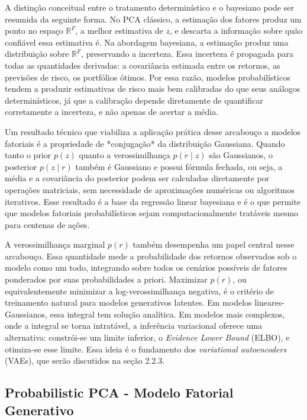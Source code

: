 A distinção conceitual entre o tratamento determinístico e o bayesiano pode ser resumida da seguinte forma. No PCA clássico, a estimação dos fatores produz um ponto no espaço $\mathbb{R}^F$, a melhor estimativa de $z$, e descarta a informação sobre quão confiável essa estimativa é. Na abordagem bayesiana, a estimação produz uma distribuição sobre $\mathbb{R}^F$, preservando a incerteza. Essa incerteza é propagada para todas as quantidades derivadas: a covariância estimada entre os retornos, as previsões de risco, os portfólios ótimos. Por essa razão, modelos probabilísticos tendem a produzir estimativas de risco mais bem calibradas do que seus análogos determinísticos, já que a calibração depende diretamente de quantificar corretamente a incerteza, e não apenas de acertar a média.

Um resultado técnico que viabiliza a aplicação prática desse arcabouço a modelos fatoriais é a propriedade de *conjugação* da distribuição Gaussiana. Quando tanto o prior $p(z)$ quanto a verossimilhança $p(r \mid z)$ são Gaussianos, o posterior $p(z \mid r)$ também é Gaussiano e possui fórmula fechada, ou seja, a média e a covariância do posterior podem ser calculadas diretamente por operações matriciais, sem necessidade de aproximações numéricas ou algoritmos iterativos. Esse resultado é a base da regressão linear bayesiana e é o que permite que modelos fatoriais probabilísticos sejam computacionalmente tratáveis mesmo para centenas de ações.

A verossimilhança marginal $p(r)$ também desempenha um papel central nesse arcabouço. Essa quantidade mede a probabilidade dos retornos observados sob o modelo como um todo, integrando sobre todos os cenários possíveis de fatores ponderados por suas probabilidades a priori. Maximizar $p(r)$, ou equivalentemente minimizar a log-verossimilhança negativa, é o critério de treinamento natural para modelos generativos latentes. Em modelos lineares-Gaussianos, essa integral tem solução analítica. Em modelos mais complexos, onde a integral se torna intratável, a inferência variacional oferece uma alternativa: constrói-se um limite inferior, o \textit{Evidence Lower Bound} (ELBO), e otimiza-se esse limite. Essa ideia é o fundamento dos \textit{variational autoencoders} (VAEs), que serão discutidos na seção 2.2.3.


\subsection{Probabilistic PCA - Modelo Fatorial Generativo}

